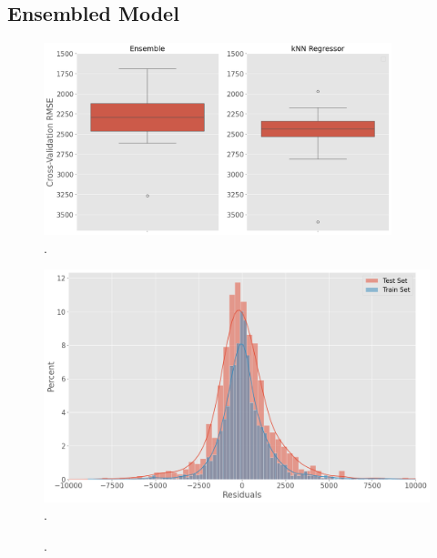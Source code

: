 \subsection{Ensembled Model}



\begin{figure}
\centering
    \includegraphics[width=0.9\textwidth]{"content/pics/boxplots_crossval.png"}
    \caption{.}
    \label{fig:}
\end{figure}



\begin{figure}
\centering
    \includegraphics[width=\textwidth]{"content/pics/Distribution_Residuals.png"}
    \caption{.}
    \label{fig:}
\end{figure}

\begin{figure}
\centering
    \caption{.}
    \label{fig:}
\end{figure}

